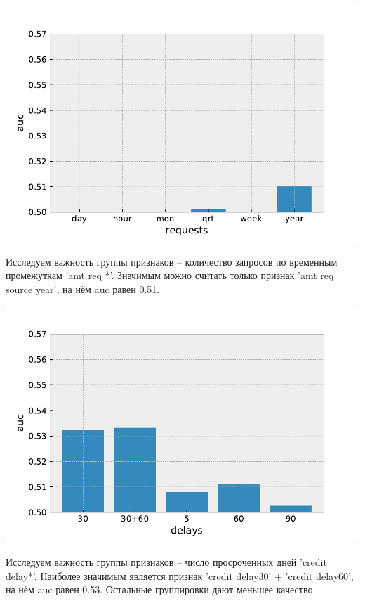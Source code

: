 \documentclass[russian, 10pt]{beamer}
\begin{document}
\begin{frame}

\includegraphics[scale=0.7]{images/requests.pdf}

Исследуем важность группы признаков -- количество запросов по временным промежуткам 'amt req *'. Значимым можно считать только признак 'amt req source year', на нём auc равен 0.51.

\end{frame}


\begin{frame}

\includegraphics[scale=0.7]{images/delays.pdf}

Исследуем важность группы признаков -- число просроченных дней 'credit delay*'. Наиболее значимым является признак 'credit delay30' + 'credit delay60', на нём auc равен 0.53. Остальные группировки дают меньшее качество.

\end{frame}
\end{document}
